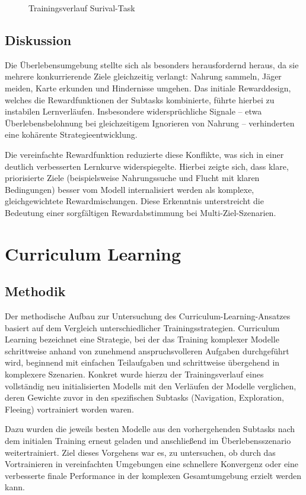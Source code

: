 \begin{figure}[htbp]
  \centering
  \caption{Trainingsverlauf Surival-Task}
  \label{fig:task4_learning_curve}
\end{figure}
\subsection{Diskussion}
Die Überlebensumgebung stellte sich als besonders herausfordernd heraus, da sie mehrere konkurrierende Ziele gleichzeitig verlangt: Nahrung sammeln, Jäger meiden, Karte erkunden und Hindernisse umgehen. Das initiale Rewarddesign, welches die Rewardfunktionen der Subtasks kombinierte, führte hierbei zu instabilen Lernverläufen. Insbesondere widersprüchliche Signale – etwa Überlebensbelohnung bei gleichzeitigem Ignorieren von Nahrung – verhinderten eine kohärente Strategieentwicklung.

Die vereinfachte Rewardfunktion reduzierte diese Konflikte, was sich in einer deutlich verbesserten Lernkurve widerspiegelte. Hierbei zeigte sich, dass klare, priorisierte Ziele (beispielsweise Nahrungssuche und Flucht mit klaren Bedingungen) besser vom Modell internalisiert werden als komplexe, gleichgewichtete Rewardmischungen. Diese Erkenntnis unterstreicht die Bedeutung einer sorgfältigen Rewardabstimmung bei Multi-Ziel-Szenarien.

\section{Curriculum Learning}
\subsection{Methodik}
\label{sec:methodology}
Der methodische Aufbau zur Untersuchung des Curriculum-Learning-Ansatzes basiert auf dem Vergleich unterschiedlicher Trainingsstrategien. Curriculum Learning bezeichnet eine Strategie, bei der das Training komplexer Modelle schrittweise anhand von zunehmend anspruchsvolleren Aufgaben durchgeführt wird, beginnend mit einfachen Teilaufgaben und schrittweise übergehend in komplexere Szenarien. Konkret wurde hierzu der Trainingsverlauf eines vollständig neu initialisierten Modells mit den Verläufen der Modelle verglichen, deren Gewichte zuvor in den spezifischen Subtasks (Navigation, Exploration, Fleeing) vortrainiert worden waren.

Dazu wurden die jeweils besten Modelle aus den vorhergehenden Subtasks nach dem initialen Training erneut geladen und anschließend im Überlebensszenario weitertrainiert. Ziel dieses Vorgehens war es, zu untersuchen, ob durch das Vortrainieren in vereinfachten Umgebungen eine schnellere Konvergenz oder eine verbesserte finale Performance in der komplexen Gesamtumgebung erzielt werden kann. 

